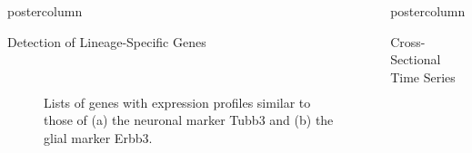 \documentclass{beamer}
\newlength{\columnheight}
\begin{document}
\begin{frame}
\begin{columns}
\begin{column}{.45\textwidth}
\begin{beamercolorbox}[center]{postercolumn}
\begin{minipage}{.98\textwidth}
{\begin{myblock}{Detection of Lineage-Specific Genes}
\begin{figure}
\begin{minipage}{0.7\textwidth}
	 \\
	\caption{Lists of genes with expression profiles similar to those of
			(a) the neuronal marker Tubb3 and (b) the glial marker Erbb3.}
	\label{fig:genebars}
\end{minipage}
\end{figure}
\end{myblock}\vfill
}\end{minipage}
\end{beamercolorbox}
\end{column}
\begin{column}{.45\textwidth}
\begin{beamercolorbox}[center]{postercolumn}
\begin{minipage}{.98\textwidth}
\parbox[t][\columnheight]{\textwidth}{
\begin{myblock}{Cross-Sectional Time Series}


\end{myblock}}
\end{minipage}
\end{beamercolorbox}
\end{column}
\end{columns}
\end{frame}
\end{document}
